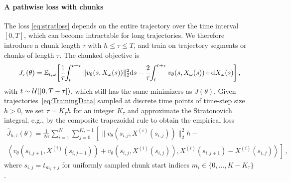 \documentclass[oneside,11pt]{article}
\theoremstyle{remark}
\begin{document}
\paragraph{A pathwise loss with chunks}
The loss \eqref{eq:stratloss} depends on the entire trajectory over the time interval $[0, T]$, which can become intractable for long trajectories. We therefore introduce a chunk length $\tau$ with $h \leq \tau \leq T$, and train on trajectory segments or chunks of length $\tau$. The chunked objective is 
\begin{align}\label{eq:strato-chunk-obj}
J_{\tau}(\theta) = \mathbb{E}_{t, \omega}\bigg[ \frac{1}{\tau}\hspace*{-0.10cm}\int_{t}^{t + \tau}\|v_{\theta}(s, X_{\omega}(s))\|_2^2\mathrm ds - \frac{2}{\tau}\hspace*{-0.10cm}\int_{t}^{t + \tau}v_{\theta}(s, X_{\omega}(s)) \circ \mathrm dX_{\omega}(s) \bigg]\,,
\end{align}
with $t \sim {\cal U}([0, T - \tau])$, which still has the same minimizers as $J(\theta)$. 
Given trajectories~\eqref{eq:TrainingData} sampled at discrete time points of time-step size $h > 0$, we set $\tau = K_{\tau}h$ for an integer $K_{\tau}$ and approximate the Stratonovich integral, e.g., by the composite trapezoidal rule to obtain the empirical loss 
\begin{multline}\label{eq:FTMLoss}
\widehat{J}_{h,\tau}(\theta) = \frac{1}{N\tau}\sum\nolimits_{i = 1}^N\sum\nolimits_{j=0}^{K_{\tau}-1} \left[\|v_{\theta}(s_{i,j}, X^{(i)}(s_{i,j}))\|_2^2h - \right.\\\left.\left\langle v_{\theta}\left(s_{i,j+1}, X^{(i)}(s_{i,j+1})\right) + v_{\theta}\left(s_{i,j}, X^{(i)}(s_{i,j}) \right), X^{(i)}(s_{i,j+1}) - X^{(i)}(s_{i,j})\right\rangle\right]\,,
\end{multline}
where $s_{i, j} = t_{m_i + j}$ for uniformly sampled chunk start indices $m_i \in \{0, \dots, K - K_{\tau}\}$. 
\end{document}
